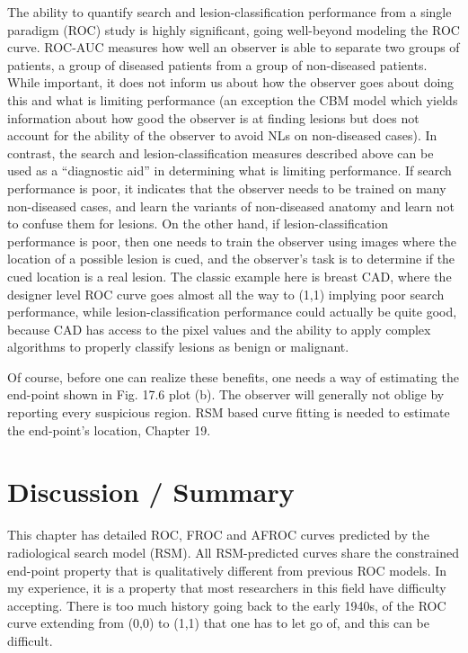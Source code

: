 \documentclass[
]{book}
\begin{document}
The ability to quantify search and lesion-classification performance from a single paradigm (ROC) study is highly significant, going well-beyond modeling the ROC curve. ROC-AUC measures how well an observer is able to separate two groups of patients, a group of diseased patients from a group of non-diseased patients. While important, it does not inform us about how the observer goes about doing this and what is limiting performance (an exception the CBM model which yields information about how good the observer is at finding lesions but does not account for the ability of the observer to avoid NLs on non-diseased cases). In contrast, the search and lesion-classification measures described above can be used as a ``diagnostic aid'' in determining what is limiting performance. If search performance is poor, it indicates that the observer needs to be trained on many non-diseased cases, and learn the variants of non-diseased anatomy and learn not to confuse them for lesions. On the other hand, if lesion-classification performance is poor, then one needs to train the observer using images where the location of a possible lesion is cued, and the observer's task is to determine if the cued location is a real lesion. The classic example here is breast CAD, where the designer level ROC curve goes almost all the way to (1,1) implying poor search performance, while lesion-classification performance could actually be quite good, because CAD has access to the pixel values and the ability to apply complex algorithms to properly classify lesions as benign or malignant.

Of course, before one can realize these benefits, one needs a way of estimating the end-point shown in Fig. 17.6 plot (b). The observer will generally not oblige by reporting every suspicious region. RSM based curve fitting is needed to estimate the end-point's location, Chapter 19.

\hypertarget{rsm-sc-discussion-summary}{%
\section{Discussion / Summary}\label{rsm-sc-discussion-summary}}

This chapter has detailed ROC, FROC and AFROC curves predicted by the radiological search model (RSM). All RSM-predicted curves share the constrained end-point property that is qualitatively different from previous ROC models. In my experience, it is a property that most researchers in this field have difficulty accepting. There is too much history going back to the early 1940s, of the ROC curve extending from (0,0) to (1,1) that one has to let go of, and this can be difficult.
\end{document}
